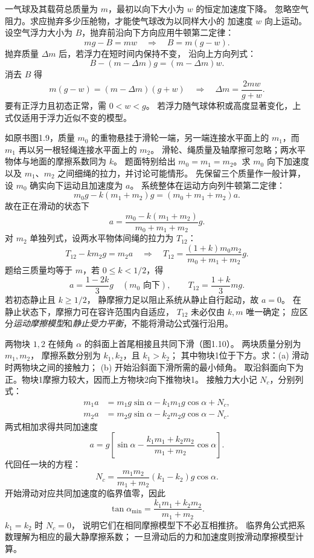 一气球及其载荷总质量为 $m$，最初以向下大小为 $w$ 的恒定加速度下降。
忽略空气阻力。求应抛弃多少压舱物，才能使气球改为以同样大小的
加速度 $w$ 向上运动。
\exsolution
设空气浮力大小为 $B$，抛弃前沿向下方向应用牛顿第二定律：
\[
 mg-B=mw\quad\Longrightarrow\quad B=m(g-w).
\]
抛弃质量 $\Delta m$ 后，若浮力在短时间内保持不变，
沿向上方向列式：
\[
 B-(m-\Delta m)g=(m-\Delta m)w.
\]
消去 $B$ 得
\[
 m(g-w)=(m-\Delta m)(g+w)
 \quad\Longrightarrow\quad
 \boxed{\Delta m=\frac{2mw}{g+w}.}
\]
\excheck 要有正浮力且初态正常，需 $0<w<g$。
若浮力随气球体积或高度显著变化，上式仅适用于浮力近似不变的模型。

如原书图1.9，质量 $m_0$ 的重物悬挂于滑轮一端，另一端连接水平面上的
$m_1$，而 $m_1$ 再以另一根轻绳连接水平面上的 $m_2$。
滑轮、绳质量及轴摩擦可忽略；两水平物体与地面的摩擦系数同为 $k$。
题面特别给出 $m_0=m_1=m_2$。求 $m_0$ 向下加速度
以及 $m_1$、$m_2$ 之间细绳的拉力，并讨论可能情形。
\exsolution
先保留三个质量作一般计算，设 $m_0$ 确实向下运动且加速度为 $a$。
系统整体在运动方向列牛顿第二定律：
\[
 m_0g-k(m_1+m_2)g=(m_0+m_1+m_2)a.
\]
故在正在滑动的状态下
\[
 a=\frac{m_0-k(m_1+m_2)}{m_0+m_1+m_2}g.
\]
对 $m_2$ 单独列式，设两水平物体间绳的拉力为 $T_{12}$：
\[
 T_{12}-km_2g=m_2a
 \quad\Longrightarrow\quad
 T_{12}=\frac{(1+k)m_0m_2}{m_0+m_1+m_2}g.
\]
题给三质量均等于 $m$，若 $0\le k<1/2$，得
\[
 \boxed{a=\frac{1-2k}{3}g\quad(m_0\text{ 向下}),\qquad
 T_{12}=\frac{1+k}{3}mg.}
\]
\excheck 若初态静止且 $k\ge1/2$，
静摩擦力足以阻止系统从静止自行起动，故 $a=0$。
在静止状态下，摩擦力可在容许范围内自适应，
$T_{12}$ 未必仅由 $k,m$ 唯一确定；
应区分\emph{运动摩擦模型}和\emph{静止受力平衡}，不能将滑动公式强行沿用。

两物块 $1,2$ 在倾角 $\alpha$ 的斜面上首尾相接且共同下滑（图1.10）。
两块质量分别为 $m_1,m_2$，
摩擦系数分别为 $k_1,k_2$，且 $k_1>k_2$；
其中物块1位于下方。求：(a) 滑动时两物块之间的接触力；
(b) 开始沿斜面下滑所需的最小倾角。
\exsolution
取沿斜面向下为正。物块1摩擦力较大，因而上方物块2向下推物块1。
接触力大小记 $N_c$，分别列式：
\[
 \begin{aligned}
 m_1a&=m_1g\sin\alpha-k_1m_1g\cos\alpha+N_c,\\
 m_2a&=m_2g\sin\alpha-k_2m_2g\cos\alpha-N_c.
 \end{aligned}
\]
两式相加求得共同加速度
\[
 a=g\left[\sin\alpha-
 \frac{k_1m_1+k_2m_2}{m_1+m_2}\cos\alpha\right].
\]
代回任一块的方程：
\[
 \boxed{N_c=\frac{m_1m_2}{m_1+m_2}
 (k_1-k_2)g\cos\alpha.}
\]
开始滑动对应共同加速度的临界值零，因此
\[
 \boxed{\tan\alpha_{\min}=
 \frac{k_1m_1+k_2m_2}{m_1+m_2}.}
\]
\excheck $k_1=k_2$ 时 $N_c=0$，
说明它们在相同摩擦模型下不必互相推挤。
临界角公式把系数理解为相应的最大静摩擦系数；
一旦滑动后的力和加速度则按滑动摩擦模型计算。

